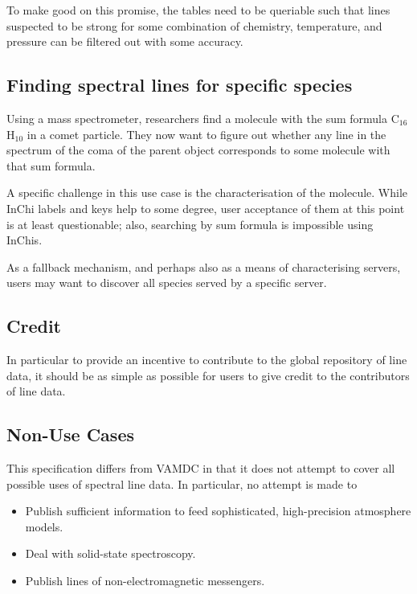 \documentclass[11pt,a4paper]{ivoa}
\begin{document}
To make good on this promise, the tables need to be queriable such that
lines suspected to be strong for some combination of chemistry,
temperature, and pressure can be filtered out with some accuracy.


\subsection{Finding spectral lines for specific species}

Using a mass spectrometer, researchers find a molecule with the
sum formula C$_{16}$H$_{10}$  in a comet particle.  They now want to
figure out whether any line in the spectrum of the coma of the parent
object corresponds to some molecule with that sum formula.

A specific challenge in this use case is the characterisation of the
molecule.  While InChi labels and keys help to some degree, user
acceptance of them at this point is at least questionable; also,
searching by sum formula is impossible using InChis.

As a fallback mechanism, and perhaps also as a means of characterising
servers, users may want to discover all species served by a specific
server.

\subsection{Credit}

In particular to provide an incentive to contribute to the global
repository of line data, it should be as simple as possible for users to
give credit to the contributors of line data.


\subsection{Non-Use Cases}

This specification differs from VAMDC in that it does not attempt to
cover all possible uses of spectral line data.  In particular, no
attempt is made to

\begin{itemize}
\item Publish sufficient information to feed sophisticated,
high-precision atmosphere models.
\item Deal with solid-state spectroscopy.
\item Publish lines of non-electromagnetic messengers.
\end{itemize}
\end{document}
